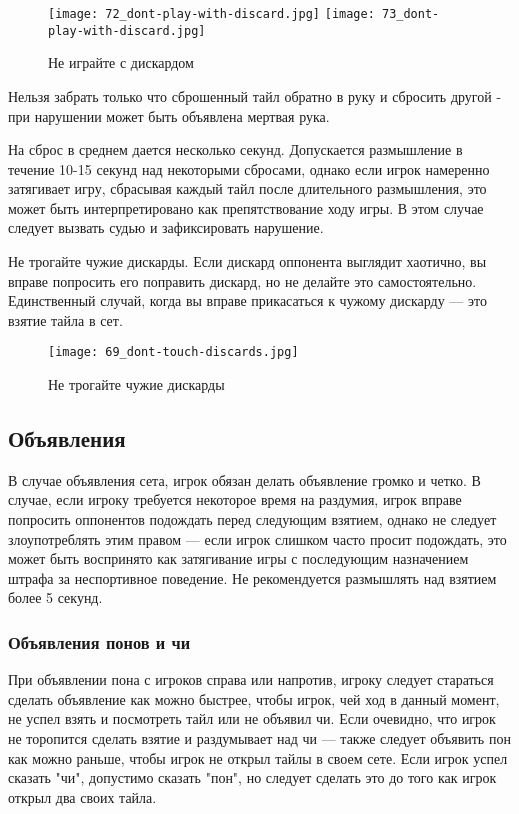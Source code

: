 \begin{figure}[H]
	\centering
	\texttt{[image: 72\_dont-play-with-discard.jpg]}
	\texttt{[image: 73\_dont-play-with-discard.jpg]}
	\caption{Не играйте с дискардом}
\end{figure}

Нельзя забрать только что сброшенный тайл обратно в руку и сбросить другой - при нарушении может быть объявлена мертвая рука.

На сброс в среднем дается несколько секунд. Допускается размышление в течение 10-15 секунд над некоторыми сбросами, однако если игрок намеренно затягивает игру, сбрасывая каждый тайл после длительного размышления, это может быть интерпретировано как препятствование ходу игры. В этом случае следует вызвать судью и зафиксировать нарушение.

Не трогайте чужие дискарды. Если дискард оппонента выглядит хаотично, вы вправе попросить его поправить дискард, но не делайте это самостоятельно. Единственный случай, когда вы вправе прикасаться к чужому дискарду --- это взятие тайла в сет.

\begin{figure}[H]
	\centering
	\texttt{[image: 69\_dont-touch-discards.jpg]}
	\caption{Не трогайте чужие дискарды}
\end{figure}

\subsection{Объявления}

В случае объявления сета, игрок обязан делать объявление громко и четко. В случае, если игроку требуется некоторое время на раздумия, игрок вправе попросить оппонентов подождать перед следующим взятием, однако не следует злоупотреблять этим правом --- если игрок слишком часто просит подождать, это может быть воспринято как затягивание игры с последующим назначением штрафа за неспортивное поведение. Не рекомендуется размышлять над взятием более 5 секунд.

\subsubsection{Объявления понов и чи}

При объявлении пона с игроков справа или напротив, игроку следует стараться сделать объявление как можно быстрее, чтобы игрок, чей ход в данный момент, не успел взять и посмотреть тайл или не объявил чи. Если очевидно, что игрок не торопится сделать взятие и раздумывает над чи --- также следует объявить пон как можно раньше, чтобы игрок не открыл тайлы в своем сете. Если игрок успел сказать "чи", допустимо сказать "пон", но следует сделать это до того как игрок открыл два своих тайла. 

